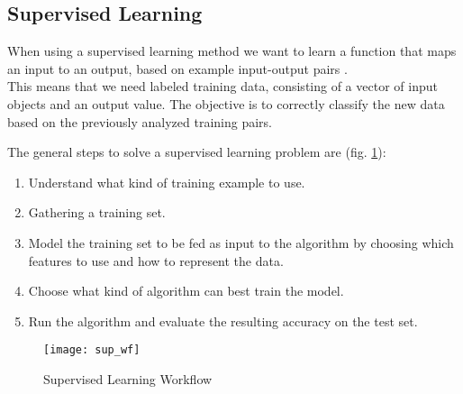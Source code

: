 \subsection{Supervised Learning} \label{supervised}
When using a supervised learning method we want to learn a function that maps an input to an output, based on example input-output pairs \cite{ai_sup}. \\
This means that we need labeled training data, consisting of a vector of input objects and an output value. The objective is to correctly classify the new data based on the previously analyzed training pairs.

The general steps to solve a supervised learning problem are (fig. \ref{fig:sup_wf}):
\begin{enumerate}[noitemsep]
	\item Understand what kind of training example to use.
	\item Gathering a training set.
	\item Model the training set to be fed as input to the algorithm by choosing which features to use and how to represent the data.
	\item Choose what kind of algorithm can best train the model.
	\item Run the algorithm and evaluate the resulting accuracy on the test set.
\end{enumerate}

\begin{figure}[H]
	\centering
	\texttt{[image: sup\_wf]}
	\caption{Supervised Learning Workflow \cite{sup_wf}}
	\label{fig:sup_wf}
\end{figure}

